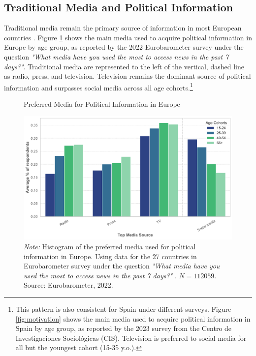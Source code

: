 \documentclass[12pt]{article}
\begin{document}
	\label{sec:context}
	
		\subsection{Traditional Media and Political Information}
	
	Traditional media remain the primary source of information in most European countries \citep{europarl2024}. Figure \ref{fig:motivation2} shows the main media used to acquire political information in Europe by age group, as reported by the 2022 Eurobarometer survey under the question \textit{"What media have you used the most to access news in the past 7 days?"}. Traditional media are represented to the left of the vertical, dashed line as radio, press, and television. Television remains the dominant source of political information and  surpasses social media across all age cohorts.\footnote{This pattern is also consistent for Spain under different surveys. Figure \ref{fig:motivation} shows the main media used to acquire political information in Spain by age group, as reported by the 2023 survey from the Centro de Investigaciones Sociológicas (CIS). Television is preferred to social media for all but the youngest cohort (15-35 y.o.). 
	}
	
	
	
	\begin{figure}[!htb]
		\centering
		\caption{Preferred Media for Political Information in Europe}
		\includegraphics[width=130mm]{figures/age_cohorts_full}
		\caption*{\small \textit{Note:} Histogram of the preferred media used for political information in Europe. Using data for the 27 countries in Eurobarometer survey under the question \textit{"What media have you used the most to access news in the past 7 days?" }. $N=112059.$ 
			Source: Eurobarometer, 2022. }
		\label{fig:motivation2}
	\end{figure}
	
\end{document}
